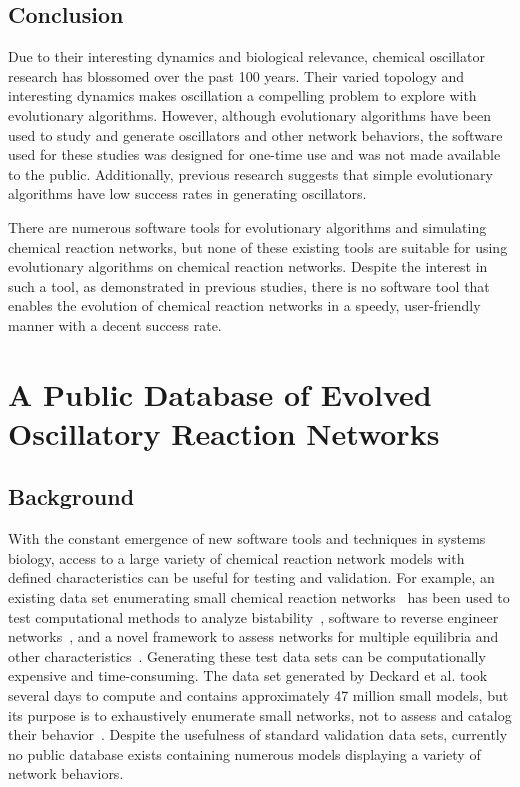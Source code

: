 \documentclass[12pt]{report}
\begin{document}
\section{Conclusion}
Due to their interesting dynamics and biological relevance, chemical oscillator research has blossomed over the past 100 years. Their varied topology and interesting dynamics makes oscillation a compelling problem to explore with evolutionary algorithms. However, although evolutionary algorithms have been used to study and generate oscillators and other network behaviors, the software used for these studies was designed for one-time use and was not made available to the public. Additionally, previous research suggests that simple evolutionary algorithms have low success rates in generating oscillators.

There are numerous software tools for evolutionary algorithms and simulating chemical reaction networks, but none of these existing tools are suitable for using evolutionary algorithms on chemical reaction networks. Despite the interest in such a tool, as demonstrated in previous studies, there is no software tool that enables the evolution of chemical reaction networks in a speedy, user-friendly manner with a decent success rate.

\chapter{A Public Database of Evolved Oscillatory Reaction Networks}
\label{chap: cesium_paper}
\section{Background}
With the constant emergence of new software tools and techniques in systems biology, access to a large variety of chemical reaction network models with defined characteristics can be useful for testing and validation. For example, an existing data set enumerating small chemical reaction networks~\cite{deckard2009} has been used to test computational methods to analyze bistability~\cite{pantea2010}, software to reverse engineer networks~\cite{nobile2013}, and a novel framework to assess networks for multiple equilibria and other characteristics~\cite{donnell2014}. Generating these test data sets can be computationally expensive and time-consuming. The data set generated by Deckard et al. took several days to compute and contains approximately 47 million small models, but its purpose is to exhaustively enumerate small networks, not to assess and catalog their behavior~\cite{deckard2009}.  Despite the usefulness of standard validation data sets, currently no public database exists containing numerous models displaying a variety of network behaviors.
\end{document}
